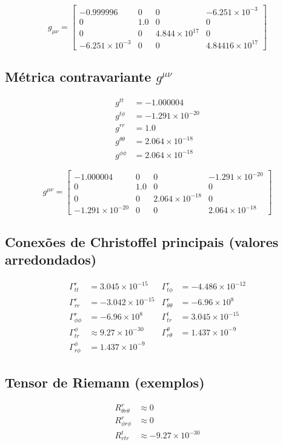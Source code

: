 \documentclass[12pt,a4paper]{article}
\begin{document}
\[
g_{\mu\nu} =
\begin{bmatrix}
-0.999996 & 0 & 0 & -6.251\times10^{-3} \\
0 & 1.0 & 0 & 0 \\
0 & 0 & 4.844\times10^{17} & 0 \\
-6.251\times10^{-3} & 0 & 0 & 4.84416\times10^{17}
\end{bmatrix}
\]

\subsection*{Métrica contravariante $g^{\mu\nu}$}
\begin{align*}
g^{tt} &= -1.000004\\
g^{t\phi} &= -1.291\times10^{-20}\\
g^{rr} &= 1.0\\
g^{\theta\theta} &= 2.064\times10^{-18}\\
g^{\phi\phi} &= 2.064\times10^{-18}
\end{align*}

\[
g^{\mu\nu} =
\begin{bmatrix}
-1.000004 & 0 & 0 & -1.291\times10^{-20} \\
0 & 1.0 & 0 & 0 \\
0 & 0 & 2.064\times10^{-18} & 0 \\
-1.291\times10^{-20} & 0 & 0 & 2.064\times10^{-18}
\end{bmatrix}
\]

\subsection*{Conexões de Christoffel principais (valores arredondados)}
\begin{align*}
\Gamma^r_{tt} &= 3.045\times10^{-15} &
\Gamma^r_{t\phi} &= -4.486\times10^{-12} \\
\Gamma^r_{rr} &= -3.042\times10^{-15} &
\Gamma^r_{\theta\theta} &= -6.96\times10^8 \\
\Gamma^r_{\phi\phi} &= -6.96\times10^8 &
\Gamma^t_{tr} &= 3.045\times10^{-15} \\
\Gamma^\phi_{tr} &\approx 9.27\times10^{-30} &
\Gamma^\theta_{r\theta} &= 1.437\times10^{-9} \\
\Gamma^\phi_{r\phi} &= 1.437\times10^{-9}
\end{align*}

\subsection*{Tensor de Riemann (exemplos)}
\begin{align*}
R^r_{\theta r \theta} &\approx 0\\
R^r_{\phi r \phi} &\approx 0\\
R^t_{r t r} &\approx -9.27\times10^{-30}
\end{align*}
\end{document}
